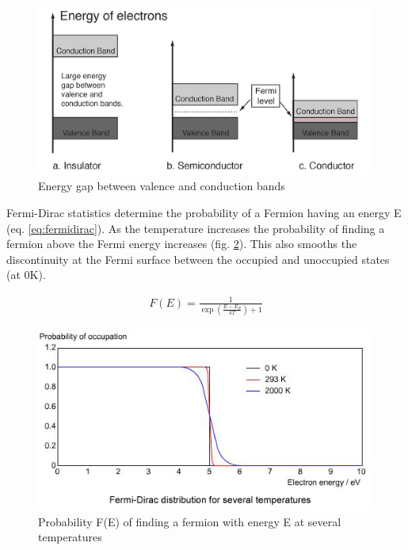 \begin{figure}
\centering
\begin{minipage}{.65\textwidth}
\centering
    \includegraphics[width=.7\linewidth]{chapters/interatomic_potential_fitting/images/energy-bands-hyperphysics.png}
    \caption{Energy gap between valence and conduction bands\cite{bandgapshyperphysics}}
    \label{fig:bandgapshyperphysics}
\end{minipage}
\end{figure}

Fermi-Dirac statistics determine the probability of a Fermion having an energy E (eq. \ref{eq:fermidirac}).  As the temperature increases the probability of finding a fermion above the Fermi energy increases (fig. \ref{fig:fermidiracdist}).  This also smooths the discontinuity at the Fermi surface between the occupied and unoccupied states (at 0K). 

\begin{equation}
\begin{split}
F(E) = \frac{1}{\exp(\frac{E - E_F}{kT}) + 1}
\end{split}
\label{eq:fermidirac}
\end{equation}

\begin{figure}
\centering
\begin{minipage}{.65\textwidth}
\centering
    \includegraphics[width=.7\linewidth]{chapters/interatomic_potential_fitting/images/fermiDirac.jpg}
    \caption{Probability F(E) of finding a fermion with energy E at several temperatures\cite{fermidiracdist}}
    \label{fig:fermidiracdist}
\end{minipage}
\end{figure}

